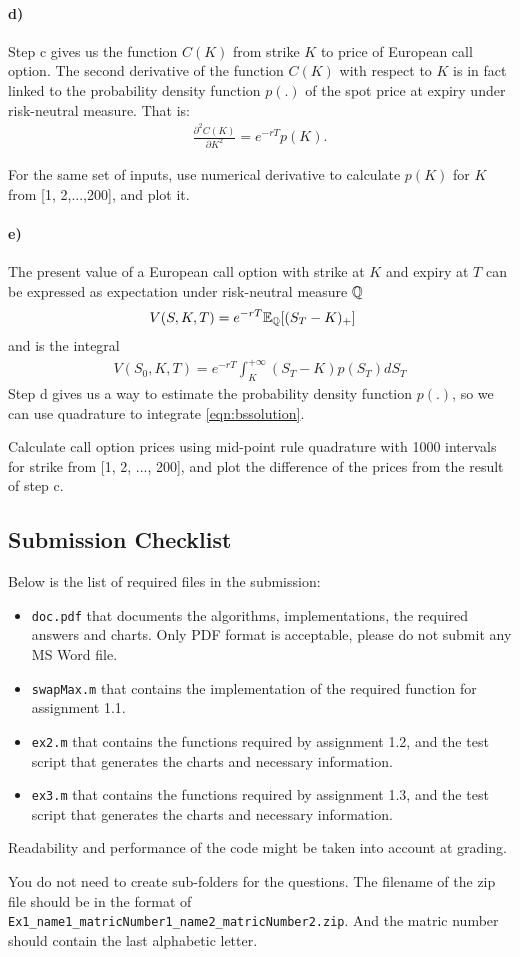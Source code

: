 \documentclass[11pt,a4paper,hidelinks,fleqn]{article}            %
\begin{document}
\paragraph{d)}
Step c gives us the function $C(K)$ from strike $K$ to price of European call option.
The second derivative of the function $C(K)$ with respect to $K$ is in fact linked to
the probability density function $p(.)$ of the spot price at expiry under risk-neutral measure.
That is:
\begin{align*}
\frac{\partial^2 C(K)}{\partial K^2} = e^{-rT} p(K).
\end{align*}

For the same set of inputs, use numerical derivative to calculate $p(K)$ for $K$ from [1, 2,...,200], and plot it.

\paragraph{e)}

The present value of a European call option with strike at $K$ and expiry at $T$ can be expressed as expectation under risk-neutral measure $\mathbb{Q}$
\begin{align*}
V(S, K, T) & = e^{-rT}\mathbb{E}_{\mathbb{Q}} [(S_T - K)_+]
\end{align*}
and is the integral
\begin{align}
\label{eqn:bssolution}
  V(S_0, K, T) = e^{-rT}\int_K^{+\infty} \left(S_T - K\right) p(S_T) dS_T 
\end{align}
Step d gives us a way to estimate the probability density function $p(.)$,
so we can use quadrature to integrate \eqref{eqn:bssolution}. 

Calculate call option prices using mid-point rule quadrature with 1000 intervals for strike from [1, 2, ..., 200],
and plot the difference of the prices from the result of step c.

\subsection*{Submission Checklist}
Below is the list of required files in the submission:
\begin{itemize}
\item \verb=doc.pdf= that documents the algorithms, implementations, the required answers and charts. Only PDF format is acceptable, please do not submit any MS Word file.
\item \verb=swapMax.m=  that contains the implementation of the required function for assignment 1.1.
\item \verb=ex2.m= that contains the functions required by assignment 1.2, and the test script that generates the charts and necessary information.
\item \verb=ex3.m= that contains the functions required by assignment 1.3, and the test script that generates the charts and necessary information.
\end{itemize}
Readability and performance of the code might be taken into account at grading.

You do not need to create sub-folders for the questions. 
The filename of the zip file should be in the format of \verb=Ex1_name1_matricNumber1_name2_matricNumber2.zip=.
And the matric number should contain the last alphabetic letter.
\end{document}
